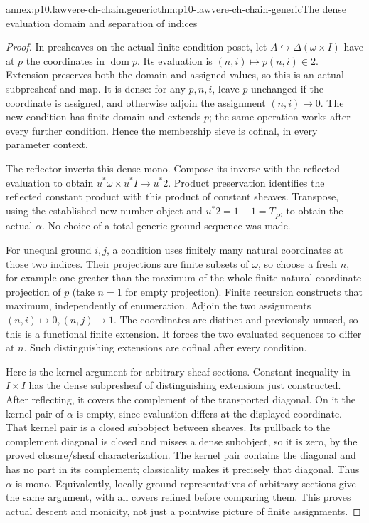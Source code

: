 \begin{annexitem}{annex:p10.lawvere-ch-chain.generic}{thm:p10-lawvere-ch-chain-generic}{The dense evaluation domain and separation of indices}
\begin{proof}
In presheaves on the actual finite-condition poset, let
\(A\hookrightarrow\Delta(\omega\times I)\) have at \(p\) the
coordinates in \(\operatorname{dom}p\). Its evaluation is
\((n,i)\mapsto p(n,i)\in2\). Extension preserves both the domain and
assigned values, so this is an actual subpresheaf and map.
It is dense: for any \(p,n,i\), leave \(p\) unchanged if the coordinate
is assigned, and otherwise adjoin the assignment \((n,i)\mapsto0\).
The new condition has finite domain and extends \(p\); the same
operation works after every further condition. Hence the membership
sieve is cofinal, in every parameter context.

The reflector inverts this dense mono. Compose its inverse with the
reflected evaluation to obtain
\(u^*\omega\times u^*I\to u^*2\). Product preservation identifies
the reflected constant product with this product of constant sheaves.
Transpose, using the established new number object and
\(u^*2=1+1=T_{\widetilde P}\), to obtain the actual \(\alpha\).
No choice of a total generic ground sequence was made.

For unequal ground \(i,j\), a condition uses finitely many natural
coordinates at those two indices. Their projections are finite subsets
of \(\omega\), so choose a fresh \(n\), for example one greater than
the maximum of the whole finite natural-coordinate projection of \(p\)
(take \(n=1\) for empty projection). Finite recursion constructs that
maximum, independently of enumeration. Adjoin the two assignments
\((n,i)\mapsto0,(n,j)\mapsto1\). The coordinates are distinct and
previously unused, so this is a functional finite extension.
It forces the two evaluated sequences to differ at \(n\).
Such distinguishing extensions are cofinal after every condition.

Here is the kernel argument for arbitrary sheaf sections. Constant
inequality in \(I\times I\) has the dense subpresheaf of distinguishing
extensions just constructed. After reflecting, it covers the complement
of the transported diagonal. On it the kernel pair of \(\alpha\)
is empty, since evaluation differs at the displayed coordinate.
That kernel pair is a closed subobject between sheaves. Its pullback
to the complement diagonal is closed and misses a dense subobject,
so it is zero, by the proved closure/sheaf characterization.
The kernel pair contains the diagonal and has no part in its complement;
classicality makes it precisely that diagonal. Thus \(\alpha\) is mono.
Equivalently, locally ground representatives of arbitrary sections give
the same argument, with all covers refined before comparing them.
This proves actual descent and monicity, not just a pointwise picture
of finite assignments.
\end{proof}
\end{annexitem}

